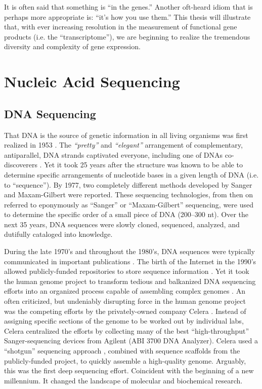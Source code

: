   It is often said that something is ``in the genes.'' Another oft-heard idiom that is perhaps more appropriate is: ``it's how you use them.'' This thesis will illustrate that, with ever increasing resolution in the measurement of functional gene products (i.e. the ``transcriptome''), we are beginning to realize the tremendous diversity and complexity of gene expression.

\section{Nucleic Acid Sequencing}
  \label{Intro:sec:Nucleic Acid Sequencing}

  \subsection{DNA Sequencing}
    \label{Intro:subsec:DNA Sequencing History}

    That DNA is the source of genetic information in all living organisms was first realized in 1953 \citep{Watson1953a}. The \textit{``pretty''} and \textit{``elegant''} arrangement of complementary, antiparallel, DNA strands captivated everyone, including one of DNAs co-discoverers \citep{Watson2012a}. Yet it took 25 years after the structure was known to be able to determine specific arrangements of nucleotide bases in a given length of DNA (i.e. to ``sequence''). By 1977, two completely different methods developed by Sanger \citep{Sanger1975a,Sanger1977b} and Maxam-Gilbert \citep{Maxam1977a} were reported. These sequencing technologies, from then on referred to eponymously as ``Sanger'' or ``Maxam-Gilbert'' sequencing, were used to determine the specific order of a small piece of DNA (200--300 nt). Over the next 35 years, DNA sequences were slowly cloned, sequenced, analyzed, and dutifully cataloged into knowledge.

    During the late 1970's and throughout the 1980's, DNA sequences were typically communicated in important publications \citep{Cordell1980a,Sanger1978a}. The birth of the Internet in the 1990's allowed publicly-funded repositories to store sequence information \citep{Benson2011a}. Yet it took the human genome project to transform tedious and balkanized DNA sequencing efforts into an organized process capable of assembling complex genomes \citep{Lander2011a,Venter2001}. An often criticized, but undeniably disrupting force in the human genome project was the competing efforts by the privately-owned company Celera \citep{Venter2008a}. Instead of assigning specific sections of the genome to be worked out by individual labs, Celera centralized the efforts by collecting many of the best ``high-throughput'' Sanger-sequencing devices from Agilent (ABI 3700 DNA Analyzer). Celera used a ``shotgun'' sequencing approach \citep{Staden1979}, combined with sequence scaffolds from the publicly-funded project, to quickly assemble a high-quality genome. Arguably, this was the first deep sequencing effort. Coincident with the beginning of a new millennium. It changed the landscape of molecular and biochemical research.

